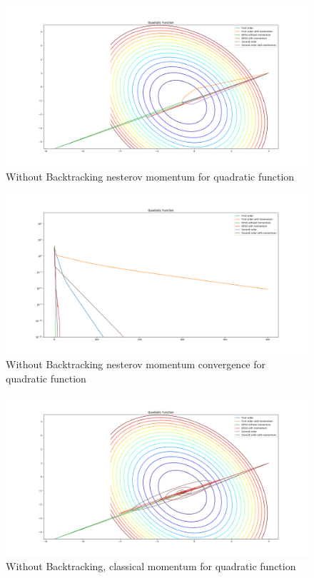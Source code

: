\documentclass{article}
\begin{document}
\begin{figure}[H]
	\includegraphics[width=\linewidth]{../Images/quadraticnesterov.png}
	\caption{Without Backtracking nesterov momentum for quadratic function}
	\label{fig:Without Backtracking nesterov momentum for quadratic function}
\end{figure}

\begin{figure}[H]
	\includegraphics[width=\linewidth]{../Images/quadraticnesterov1.png}
	\caption{Without Backtracking nesterov momentum convergence for quadratic function}
	\label{fig:Without Backtracking nesterov momentum convergence for quadratic function}
\end{figure}

\begin{figure}[H]
	\includegraphics[width=\linewidth]{../Images/quadraticmomentum.png}
	\caption{Without Backtracking, classical momentum for quadratic function}
	\label{fig:Without Backtracking, classical momentum for quadratic function}
\end{figure}
\end{document}
